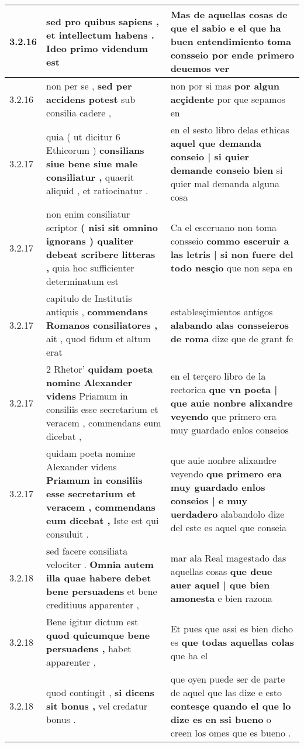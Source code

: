 \begin{tabular}{|p{1cm}|p{6.5cm}|p{6.5cm}|}
3.2.16 & sed pro quibus sapiens , \textbf{ et intellectum habens . } Ideo primo videndum est & Mas de aquellas cosas de que el sabio \textbf{ e el que ha buen entendimiento toma consseio } por ende primero deuemos ver \\\hline
3.2.16 & non per se , \textbf{ sed per accidens potest } sub consilia cadere , & non por si mas \textbf{ por algun acçidente } por que sepamos en \\\hline
3.2.17 & quia ( ut dicitur 6 Ethicorum ) \textbf{ consilians siue bene siue male consiliatur , } quaerit aliquid , et ratiocinatur . & en el sesto libro delas ethicas \textbf{ aquel que demanda conseio | si quier demande conseio bien } si quier mal demanda alguna cosa \\\hline
3.2.17 & non enim consiliatur scriptor \textbf{ ( nisi sit omnino ignorans ) qualiter debeat scribere litteras , } quia hoc sufficienter determinatum est & Ca el esceruano non toma consseio \textbf{ commo esceruir a las letris | si non fuere del todo nesçio } que non sepa en \\\hline
3.2.17 & capitulo de Institutis antiquis , \textbf{ commendans Romanos consiliatores , } ait , quod fidum et altum erat & establesçimientos antigos \textbf{ alabando alas consseieros de roma } dize que de grant fe \\\hline
3.2.17 & 2 Rhetor’ \textbf{ quidam poeta nomine Alexander videns } Priamum in consiliis esse secretarium et veracem , commendans eum dicebat , & en el terçero libro de la rectorica \textbf{ que vn poeta | que auie nonbre alixandre veyendo } que primero era muy guardado enlos conseios \\\hline
3.2.17 & quidam poeta nomine Alexander videns \textbf{ Priamum in consiliis esse secretarium et veracem , commendans eum dicebat , } Iste est qui consuluit . & que auie nonbre alixandre veyendo \textbf{ que primero era muy guardado enlos conseios | e muy uerdadero } alabandolo dize del este es aquel que conseia \\\hline
3.2.18 & sed facere consiliata velociter . \textbf{ Omnia autem illa quae habere debet bene persuadens } et bene creditiuus apparenter , & mar ala Real magestado das aquellas cosas \textbf{ que deue auer aquel | que bien amonesta } e bien razona \\\hline
3.2.18 & Bene igitur dictum est \textbf{ quod quicumque bene persuadens , } habet apparenter , & Et pues que assi es bien dicho es \textbf{ que todas aquellas colas } que ha el \\\hline
3.2.18 & quod contingit , \textbf{ si dicens sit bonus , } vel credatur bonus . & que oyen puede ser de parte de aquel que las dize e esto \textbf{ contesçe quando el que lo dize es en ssi bueno } o creen los omes que es bueno . \\\hline

\end{tabular}
